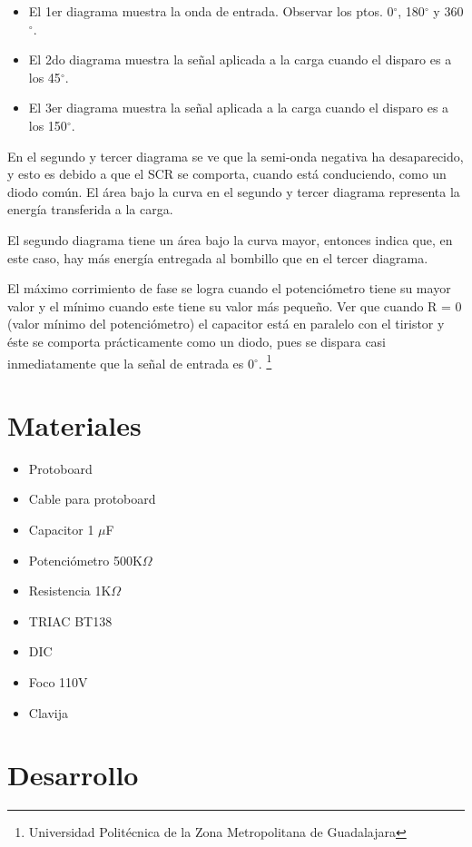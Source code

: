 \documentclass[10pt,a4paper]{article}
\begin{document}
\begin{itemize}
\item El 1er diagrama muestra la onda de entrada. Observar los ptos. 0$^{\circ}$, 180$^{\circ}$ y 360$^{\circ}$.
\item El 2do diagrama muestra la señal aplicada a la carga cuando el disparo es a los 45$^{\circ}$.
\item El 3er diagrama muestra la señal aplicada a la carga cuando el disparo es a los 150$^{\circ}$.
\end{itemize}

En el segundo y tercer diagrama se ve que la semi-onda negativa ha desaparecido, y esto es debido a que el SCR se comporta, cuando está conduciendo, como un diodo común. El área bajo la curva en el segundo y tercer diagrama representa la energía transferida a la carga.

El segundo diagrama tiene un área bajo la curva mayor, entonces indica que, en este caso, hay más energía entregada al bombillo que en el tercer diagrama.

El máximo corrimiento de fase se logra cuando el potenciómetro tiene su mayor valor y el mínimo cuando este tiene su valor más pequeño. Ver que cuando R = 0 (valor mínimo del potenciómetro) el capacitor está en paralelo con el tiristor y éste se comporta prácticamente como un diodo, pues se dispara casi inmediatamente que la señal de entrada es 0$^{\circ}$.
\footnote{Universidad Politécnica de la Zona Metropolitana de Guadalajara}

\newpage
\section{Materiales}
\begin{itemize}
\item Protoboard
\item Cable para protoboard
\item Capacitor 1 $\mu$F
\item Potenciómetro 500K$\Omega$
\item Resistencia 1K$\Omega$
\item TRIAC BT138
\item DIC 
\item Foco 110V 
\item Clavija
\end{itemize}

\section{Desarrollo}
\end{document}
